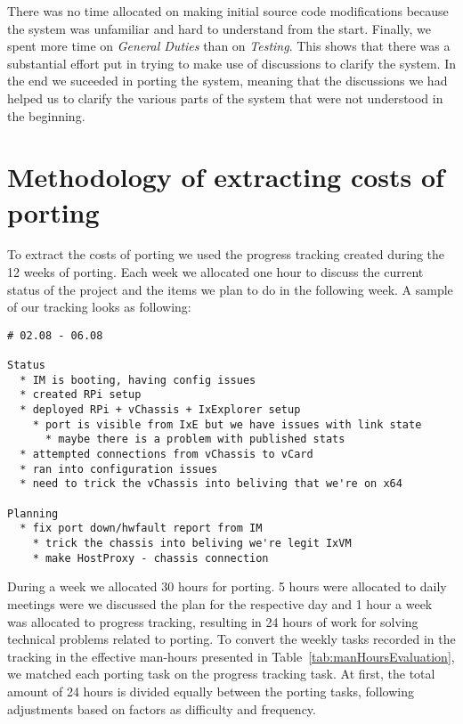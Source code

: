 \FloatBarrier

There was no time allocated on making initial source code modifications because
the system was unfamiliar and hard to understand from the start. Finally, we
spent more time on \textit{General Duties} than on \textit{Testing}. This shows
that there was a substantial effort put in trying to make use of discussions
to clarify the system. In the end we suceeded in porting the system, meaning
that the discussions we had helped us to clarify the various parts of the system
that were not understood in the beginning.

\section{Methodology of extracting costs of porting}

To extract the costs of porting we used the progress tracking created during the
12 weeks of porting. Each week we allocated one hour to discuss the current
status of the project and the items we plan to do in the following week. A
sample of our tracking looks as following:

\begin{verbatim}
# 02.08 - 06.08

Status
  * IM is booting, having config issues
  * created RPi setup
  * deployed RPi + vChassis + IxExplorer setup
    * port is visible from IxE but we have issues with link state
      * maybe there is a problem with published stats
  * attempted connections from vChassis to vCard
  * ran into configuration issues
  * need to trick the vChassis into beliving that we're on x64

Planning
  * fix port down/hwfault report from IM
    * trick the chassis into beliving we're legit IxVM
    * make HostProxy - chassis connection
\end{verbatim}

During a week we allocated 30 hours for porting. 5 hours were allocated to daily
meetings were we discussed the plan for the respective day and 1 hour a week was
allocated to progress tracking, resulting in 24 hours of work for solving
technical problems related to porting. To convert the weekly tasks recorded in
the tracking in the effective man-hours presented
in Table~\ref{tab:manHoursEvaluation}, we matched each porting task on the
progress tracking task. At first, the total amount of 24 hours is divided
equally between the porting tasks, following adjustments based on factors as
difficulty and frequency.

